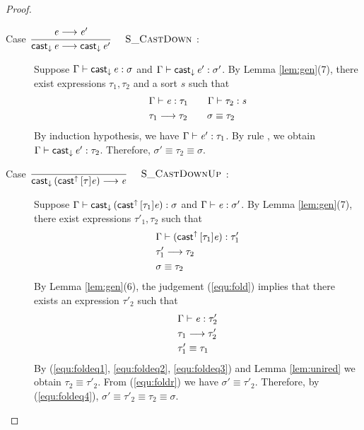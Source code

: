 \begin{proof}
\begin{description}
        \item[Case ${\displaystyle\frac{\begin{array}{l} {\mathit{e} \longrightarrow \mathit{e'}} \end{array}}{ \mathsf{cast}_{\downarrow} \, \mathit{e} \longrightarrow \mathsf{cast}_{\downarrow} \, \mathit{e'}}\quad\textsc{ {\textsc{S\_CastDown}}{} }}$:] $\quad$ \\
        Suppose $\Gamma  \vdash  \mathsf{cast}_{\downarrow} \, \mathit{e}  :  \sigma$ and $\Gamma  \vdash  \mathsf{cast}_{\downarrow} \, \mathit{e'}  :  \sigma'$. By Lemma \ref{lem:gen}(7), there exist expressions $\tau_{{\mathrm{1}}}, \tau_{{\mathrm{2}}}$ and a sort $s$ such that 
        \begin{align*}
            &\Gamma  \vdash  \mathit{e}  :  \tau_{{\mathrm{1}}} \qquad \Gamma  \vdash  \tau_{{\mathrm{2}}}  :  \mathit{s} \\
            &\tau_{{\mathrm{1}}}  \longrightarrow  \tau_{{\mathrm{2}}} \qquad \sigma  \equiv  \tau_{{\mathrm{2}}}
        \end{align*}
        By induction hypothesis, we have $\Gamma  \vdash  \mathit{e'}  :  \tau_{{\mathrm{1}}}$. By rule , we obtain $\Gamma  \vdash  \mathsf{cast}_{\downarrow} \, \mathit{e'}  :  \tau_{{\mathrm{2}}}$. Therefore, $\sigma'  \equiv  \tau_{{\mathrm{2}}}  \equiv  \sigma$.
        
        \item[Case ${\displaystyle\frac{\begin{array}{l} \end{array}}{ \mathsf{cast}_{\downarrow} \, ( \mathsf{cast}^{\uparrow} \, [ \tau ] \mathit{e} ) \longrightarrow \mathit{e}}\quad\textsc{ {\textsc{S\_CastDownUp}}{} }}$:] $\quad$ \\
        Suppose $\Gamma  \vdash  \mathsf{cast}_{\downarrow} \, (  \mathsf{cast}^{\uparrow} \, [  \tau_{{\mathrm{1}}}  ]  \mathit{e}  )  :  \sigma$ and $\Gamma  \vdash  \mathit{e}  :  \sigma'$. By Lemma \ref{lem:gen}(7), there exist expressions $\tau'_{{\mathrm{1}}}, \tau_{{\mathrm{2}}}$ such that 
        \begin{align}
            &\Gamma  \vdash  (  \mathsf{cast}^{\uparrow} \, [  \tau_{{\mathrm{1}}}  ]  \mathit{e}  )  :  \tau'_{{\mathrm{1}}} \label{equ:fold} \\
            &\tau'_{{\mathrm{1}}}  \longrightarrow  \tau_{{\mathrm{2}}} \label{equ:foldeq1} \\
            &\sigma  \equiv  \tau_{{\mathrm{2}}} \label{equ:foldeq4}
        \end{align}
        By Lemma \ref{lem:gen}(6), the judgement (\ref{equ:fold}) implies that there exists an expression $\tau'_{{\mathrm{2}}}$ such that
        \begin{align}
            &\Gamma  \vdash  \mathit{e}  :  \tau'_{{\mathrm{2}}} \label{equ:foldr} \\
            &\tau_{{\mathrm{1}}}  \longrightarrow  \tau'_{{\mathrm{2}}} \label{equ:foldeq2} \\
            &\tau'_{{\mathrm{1}}}  \equiv  \tau_{{\mathrm{1}}} \label{equ:foldeq3}
        \end{align}
        By (\ref{equ:foldeq1}, \ref{equ:foldeq2}, \ref{equ:foldeq3}) and Lemma \ref{lem:unired} we obtain $\tau_{{\mathrm{2}}}  \equiv  \tau'_{{\mathrm{2}}}$. From (\ref{equ:foldr}) we have $\sigma'  \equiv  \tau'_{{\mathrm{2}}}$. Therefore, by (\ref{equ:foldeq4}), $\sigma'  \equiv  \tau'_{{\mathrm{2}}}  \equiv  \tau_{{\mathrm{2}}}  \equiv  \sigma$.
        

\end{description}
\end{proof}
